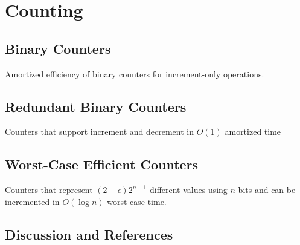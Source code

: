 \chapter{Counting}

\section{Binary Counters}

Amortized efficiency of binary counters for increment-only operations.

\section{Redundant Binary Counters}

Counters that support increment and decrement in $O(1)$ amortized time

\section{Worst-Case Efficient Counters}

Counters that represent $(2-\epsilon)2^{n-1}$ different values using $n$
bits and can be incremented in $O(\log n)$ worst-case time.

\section{Discussion and References}



